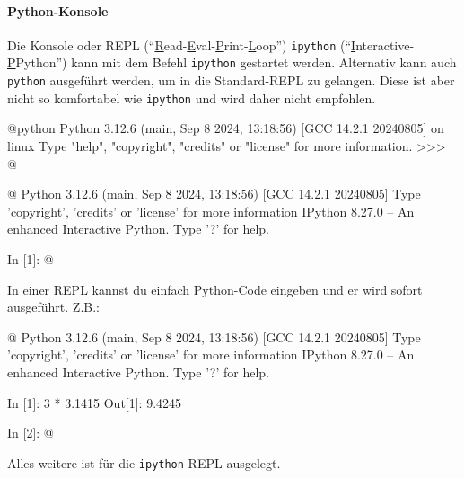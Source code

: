 \paragraph*{Python-Konsole}\mbox{}

Die Konsole oder REPL (\enquote{\underline{R}ead-\underline{E}val-\underline{P}rint-\underline{L}oop}) \texttt{ipython} (\enquote{\underline{I}nteractive-\underline{P}Python}) kann mit dem Befehl \texttt{ipython} gestartet werden. Alternativ kann auch \texttt{python} ausgeführt werden, um in die Standard-REPL zu gelangen.
Diese ist aber nicht so komfortabel wie \texttt{ipython}
und wird daher nicht empfohlen.
\begin{commandshell}[][minted language=text]
    @\shellprefix@ python
    Python 3.12.6 (main, Sep  8 2024, 13:18:56) [GCC 14.2.1 20240805] on linux
    Type "help", "copyright", "credits" or "license" for more information.
    >>> @\shellcursor@
\end{commandshell}

\begin{commandshell}[][minted language=text]
    @\shellprefix@ipython
    Python 3.12.6 (main, Sep  8 2024, 13:18:56) [GCC 14.2.1 20240805]
    Type 'copyright', 'credits' or 'license' for more information
    IPython 8.27.0 -- An enhanced Interactive Python. Type '?' for help.

    In [1]: @\shellcursor@
\end{commandshell}

In einer REPL kannst du einfach Python-Code eingeben
und er wird sofort ausgeführt. Z.B.:
\begin{commandshell}[][minted language=text]
    @\shellprefix@ipython
    Python 3.12.6 (main, Sep  8 2024, 13:18:56) [GCC 14.2.1 20240805]
    Type 'copyright', 'credits' or 'license' for more information
    IPython 8.27.0 -- An enhanced Interactive Python. Type '?' for help.

    In [1]: 3 * 3.1415
    Out[1]: 9.4245

    In [2]: @\shellcursor@
\end{commandshell}

Alles weitere ist für die \texttt{ipython}-REPL ausgelegt.

